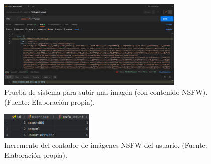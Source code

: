 \begin{itemize}
	\begin{figure}[H]
		\centering
		\includegraphics[width=0.8\textwidth]{res/images/postman-system-test-upload-image-nsfw}
		\caption{Prueba de sistema para subir una imagen (con contenido NSFW). (Fuente: Elaboración propia).}
		\label{fig:postman-test-2}
	\end{figure}

	\begin{figure}[H]
		\centering
		\includegraphics[width=0.4\textwidth]{res/images/postman-system-test-upload-image-nsfw-db}
		\caption{Incremento del contador de imágenes NSFW del usuario. (Fuente: Elaboración propia).}
		\label{fig:postman-test-2-db}
	\end{figure}
\end{itemize}
